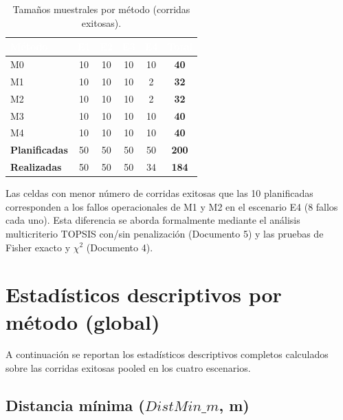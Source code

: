 \documentclass[12pt,a4paper,oneside]{book}
\begin{document}
\begin{table}[h]
\centering
\caption{Tamaños muestrales por método (corridas exitosas).}
\renewcommand{\arraystretch}{1.3}
\begin{tabular}{lccccc}
\toprule
\rowcolor{primary}
\textcolor{white}{\textbf{Método}} & 
\textcolor{white}{\textbf{E1}} & 
\textcolor{white}{\textbf{E2}} & 
\textcolor{white}{\textbf{E3}} & 
\textcolor{white}{\textbf{E4}} & 
\textcolor{white}{\textbf{Total}} \\
\midrule
M0 & 10 & 10 & 10 & 10 & \textbf{40} \\
M1 & 10 & 10 & 10 & 2 & \textbf{32} \\
M2 & 10 & 10 & 10 & 2 & \textbf{32} \\
M3 & 10 & 10 & 10 & 10 & \textbf{40} \\
M4 & 10 & 10 & 10 & 10 & \textbf{40} \\
\midrule
\textbf{Planificadas} & 50 & 50 & 50 & 50 & \textbf{200} \\
\textbf{Realizadas} & 50 & 50 & 50 & 34 & \textbf{184} \\
\bottomrule
\end{tabular}
\end{table}

Las celdas con menor número de corridas exitosas que las 10 planificadas corresponden a los fallos operacionales de M1 y M2 en el escenario E4 (8 fallos cada uno). Esta diferencia se aborda formalmente mediante el análisis multicriterio TOPSIS con/sin penalización (Documento 5) y las pruebas de Fisher exacto y $\chi^2$ (Documento 4).

\section{Estadísticos descriptivos por método (global)}

A continuación se reportan los estadísticos descriptivos completos calculados sobre las corridas exitosas pooled en los cuatro escenarios.

\subsection{Distancia mínima ($\textit{DistMin\_m}$, m)}
\end{document}
